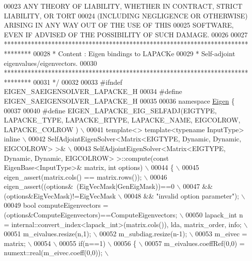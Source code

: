 \begin{DoxyCode}
00023 \textcolor{comment}{ ANY THEORY OF LIABILITY, WHETHER IN CONTRACT, STRICT LIABILITY, OR TORT}
00024 \textcolor{comment}{ (INCLUDING NEGLIGENCE OR OTHERWISE) ARISING IN ANY WAY OUT OF THE USE OF THIS}
00025 \textcolor{comment}{ SOFTWARE, EVEN IF ADVISED OF THE POSSIBILITY OF SUCH DAMAGE.}
00026 \textcolor{comment}{}
00027 \textcolor{comment}{ ********************************************************************************}
00028 \textcolor{comment}{ *   Content : Eigen bindings to LAPACKe}
00029 \textcolor{comment}{ *    Self-adjoint eigenvalues/eigenvectors.}
00030 \textcolor{comment}{ ********************************************************************************}
00031 \textcolor{comment}{*/}
00032 
00033 \textcolor{preprocessor}{#ifndef EIGEN\_SAEIGENSOLVER\_LAPACKE\_H}
00034 \textcolor{preprocessor}{#define EIGEN\_SAEIGENSOLVER\_LAPACKE\_H}
00035 
00036 \textcolor{keyword}{namespace }\hyperlink{namespace_eigen}{Eigen} \{ 
00037 
00040 \textcolor{preprocessor}{#define EIGEN\_LAPACKE\_EIG\_SELFADJ(EIGTYPE, LAPACKE\_TYPE, LAPACKE\_RTYPE, LAPACKE\_NAME, EIGCOLROW,
       LAPACKE\_COLROW ) \(\backslash\)}
00041 \textcolor{preprocessor}{template<> template<typename InputType> inline \(\backslash\)}
00042 \textcolor{preprocessor}{SelfAdjointEigenSolver<Matrix<EIGTYPE, Dynamic, Dynamic, EIGCOLROW> >& \(\backslash\)}
00043 \textcolor{preprocessor}{SelfAdjointEigenSolver<Matrix<EIGTYPE, Dynamic, Dynamic, EIGCOLROW> >::compute(const EigenBase<InputType>&
       matrix, int options) \(\backslash\)}
00044 \textcolor{preprocessor}{\{ \(\backslash\)}
00045 \textcolor{preprocessor}{  eigen\_assert(matrix.cols() == matrix.rows()); \(\backslash\)}
00046 \textcolor{preprocessor}{  eigen\_assert((options&~(EigVecMask|GenEigMask))==0 \(\backslash\)}
00047 \textcolor{preprocessor}{          && (options&EigVecMask)!=EigVecMask \(\backslash\)}
00048 \textcolor{preprocessor}{          && "invalid option parameter"); \(\backslash\)}
00049 \textcolor{preprocessor}{  bool computeEigenvectors = (options&ComputeEigenvectors)==ComputeEigenvectors; \(\backslash\)}
00050 \textcolor{preprocessor}{  lapack\_int n = internal::convert\_index<lapack\_int>(matrix.cols()), lda, matrix\_order, info; \(\backslash\)}
00051 \textcolor{preprocessor}{  m\_eivalues.resize(n,1); \(\backslash\)}
00052 \textcolor{preprocessor}{  m\_subdiag.resize(n-1); \(\backslash\)}
00053 \textcolor{preprocessor}{  m\_eivec = matrix; \(\backslash\)}
00054 \textcolor{preprocessor}{\(\backslash\)}
00055 \textcolor{preprocessor}{  if(n==1) \(\backslash\)}
00056 \textcolor{preprocessor}{  \{ \(\backslash\)}
00057 \textcolor{preprocessor}{    m\_eivalues.coeffRef(0,0) = numext::real(m\_eivec.coeff(0,0)); \(\backslash\)}

\end{DoxyCode}
